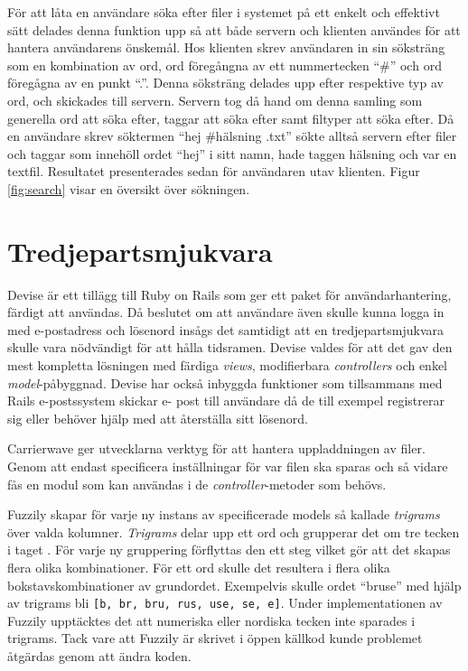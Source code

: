 För att låta en användare söka efter filer i systemet på ett enkelt och
effektivt sätt delades denna funktion upp så att både servern och klienten
användes för att hantera användarens önskemål. Hos klienten skrev användaren in
sin söksträng som en kombination av ord, ord föregångna av ett nummertecken
``\#'' och ord föregågna av en punkt ``.''. Denna söksträng delades upp efter
respektive typ av ord, och skickades till servern. Servern tog då hand om denna
samling som generella ord att söka efter, taggar att söka efter samt filtyper
att söka efter. Då en användare skrev söktermen ``hej \#hälsning .txt'' sökte
alltså servern efter filer och taggar som innehöll ordet ``hej'' i sitt namn,
hade taggen hälsning och var en textfil. Resultatet presenterades sedan för
användaren utav klienten. Figur \ref{fig:search} visar en översikt över
sökningen.

\section{Tredjepartsmjukvara}

Devise är ett tillägg till Ruby on Rails som ger ett paket för
användarhantering, färdigt att användas. Då beslutet om att användare även
skulle kunna logga in med e-postadress och lösenord insågs det samtidigt att en
tredjepartsmjukvara skulle vara nödvändigt för att hålla tidsramen. Devise
valdes för att det gav den mest kompletta lösningen med färdiga \emph{views},
modifierbara \emph{controllers} och enkel \emph{model}-påbyggnad. Devise har
också inbyggda funktioner som tillsammans med Rails e-postssystem skickar e-
post till användare då de till exempel registrerar sig eller behöver hjälp med
att återställa sitt lösenord.

Carrierwave ger utvecklarna verktyg för att hantera uppladdningen av filer.
Genom att endast specificera inställningar för var filen ska sparas och så
vidare fås en modul som kan användas i de \emph{controller}-metoder som behövs.

Fuzzily skapar för varje ny instans av specificerade models så kallade
\emph{trigrams} över valda kolumner. \emph{Trigrams} delar upp ett ord och
grupperar det om tre tecken i taget \cite{n-grams}. För varje ny gruppering
förflyttas den ett steg vilket gör att det skapas flera olika kombinationer.
För ett ord skulle det resultera i flera olika bokstavskombinationer av
grundordet. Exempelvis skulle ordet ``bruse'' med hjälp av trigrams bli
\texttt{[b, br, bru, rus, use, se, e]}. Under implementationen av Fuzzily
upptäcktes det att  numeriska eller nordiska tecken inte sparades i trigrams.
Tack vare att Fuzzily är skrivet i öppen källkod kunde problemet åtgärdas genom
att ändra koden.

